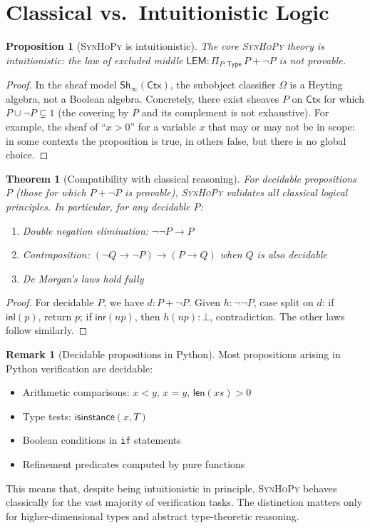 \documentclass[11pt,a4paper]{report}
\theoremstyle{definition}
\newtheorem{remark}[definition]{Remark}
\theoremstyle{plain}
\newtheorem{theorem}[definition]{Theorem}
\newtheorem{proposition}[definition]{Proposition}
\newcommand{\Type}{\mathsf{Type}}
\newcommand{\Ctx}{\mathsf{Ctx}}
\newcommand{\synhopy}{\textsc{SynHoPy}}
\newcommand{\Sh}{\mathsf{Sh}}
\begin{document}
\section{Classical vs.\ Intuitionistic Logic}

\begin{proposition}[\synhopy{} is intuitionistic]
\label{prop:intuitionistic}
The core \synhopy{} theory is intuitionistic: the law of excluded middle
$\mathsf{LEM} : \Pi_{P:\Type}\, P + \neg P$ is \emph{not} provable.
\end{proposition}
\begin{proof}
In the sheaf model $\Sh_\infty(\Ctx)$, the subobject classifier $\Omega$ is
a Heyting algebra, not a Boolean algebra.  Concretely, there exist sheaves $P$
on $\Ctx$ for which $P \cup \neg P \subsetneq 1$ (the covering by $P$ and its
complement is not exhaustive).  For example, the sheaf of ``$x > 0$'' for a
variable $x$ that may or may not be in scope: in some contexts the proposition
is true, in others false, but there is no global choice.
\end{proof}

\begin{theorem}[Compatibility with classical reasoning]
\label{thm:classical-compat}
For decidable propositions $P$ (those for which $P + \neg P$ is provable),
\synhopy{} validates all classical logical principles.  In particular, for
any decidable $P$:
\begin{enumerate}
  \item Double negation elimination: $\neg\neg P \to P$
  \item Contraposition: $(\neg Q \to \neg P) \to (P \to Q)$ when $Q$ is also decidable
  \item De Morgan's laws hold fully
\end{enumerate}
\end{theorem}
\begin{proof}
For decidable $P$, we have $d : P + \neg P$.  Given $h : \neg\neg P$, case
split on $d$: if $\mathsf{inl}(p)$, return $p$; if $\mathsf{inr}(np)$, then
$h(np) : \bot$, contradiction.  The other laws follow similarly.
\end{proof}

\begin{remark}[Decidable propositions in Python]
Most propositions arising in Python verification are decidable:
\begin{itemize}
  \item Arithmetic comparisons: $x < y$, $x = y$, $\mathsf{len}(xs) > 0$
  \item Type tests: $\mathsf{isinstance}(x, T)$
  \item Boolean conditions in \lstinline[style=python]{if} statements
  \item Refinement predicates computed by pure functions
\end{itemize}
This means that, despite being intuitionistic in principle, \synhopy{} behaves
classically for the vast majority of verification tasks.  The distinction
matters only for higher-dimensional types and abstract type-theoretic reasoning.
\end{remark}
\end{document}
